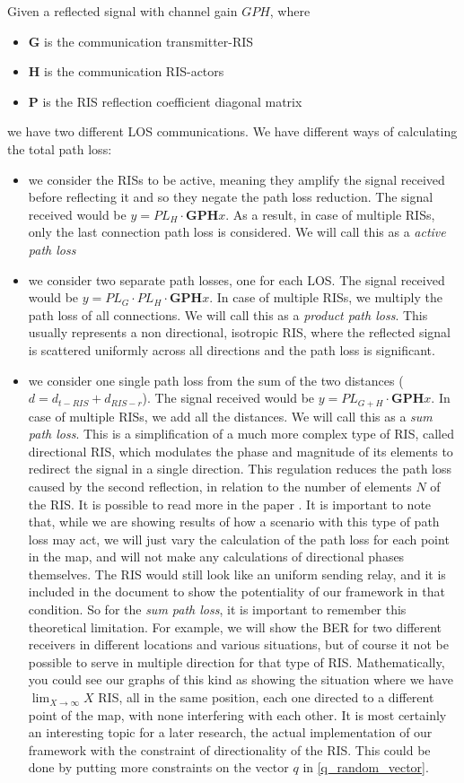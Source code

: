 Given a reflected signal with channel gain $GPH$, where
\begin{itemize}
  \item $\bm{G}$ is the communication transmitter-RIS
  \item $\bm{H}$ is the communication RIS-actors
  \item $\bm{P}$ is the RIS reflection coefficient diagonal matrix
\end{itemize}
we have two different LOS communications. We have different ways of calculating the total path loss:
\begin{itemize}
  \item we consider the RISs to be active, meaning they amplify the signal received before reflecting it and so they negate the path loss reduction. The signal received would be $y = PL_H \cdot \bm{GPH}x$. As a result, in case of multiple RISs, only the last connection path loss is considered. We will call this as a \textit{active path loss}
  \item we consider two separate path losses, one for each LOS. The signal received would be $y = PL_G \cdot PL_H \cdot \bm{GPH}x$. In case of multiple RISs, we multiply the path loss of all connections. We will call this as a \textit{product path loss}. This usually represents a non directional, isotropic RIS, where the reflected signal is scattered uniformly across all directions and the path loss is significant.
  \item we consider one single path loss from the sum of the two distances ($d = d_{t-RIS} + d_{RIS-r}$). The signal received would be $y = PL_{G+H} \cdot \bm{GPH}x$. In case of multiple RISs, we add all the distances. We will call this as a \textit{sum path loss}. This is a simplification of a much more complex type of RIS, called directional RIS, which modulates the phase and magnitude of its elements to redirect the signal in a single direction. This regulation reduces the path loss caused by the second reflection, in relation to the number of elements $N$ of the RIS. It is possible to read more in the paper \cite{8888223}. It is important to note that, while we are showing results of how a scenario with this type of path loss may act, we will just vary the calculation of the path loss for each point in the map, and will not make any calculations of directional phases themselves. The RIS would still look like an uniform sending relay, and it is included in the document to show the potentiality of our framework in that condition. So for the \textit{sum path loss}, it is important to remember this theoretical limitation. For example, we will show the BER for two different receivers in different locations and various situations, but of course it not be possible to serve in multiple direction for that type of RIS. Mathematically, you could see our graphs of this kind as showing the situation where we have  $\lim_{X \to \infty} X$ RIS, all in the same position, each one directed to a different point of the map, with none interfering with each other. It is most certainly an interesting topic for a later research, the actual implementation of our framework with the constraint of directionality of the RIS. This could be done by putting more constraints on the vector $q$ in \eqref{q_random_vector}.

\end{itemize}
